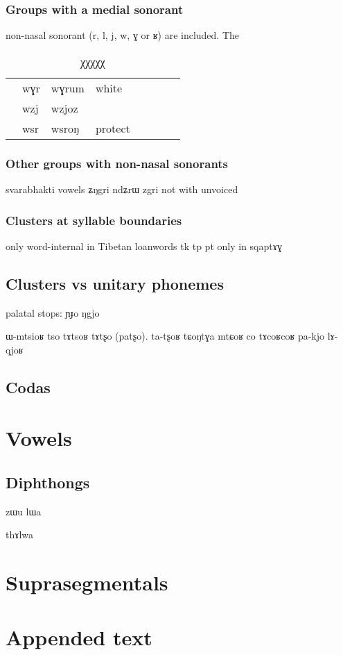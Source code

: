 \documentclass[oldfontcommands,oneside,a4paper,11pt]{article}
\newcommand{\ipa}[1]{{\phon #1}} %
\begin{document}
 \subsubsection{Groups with a medial sonorant } \label{sec:medial}
  non-nasal sonorant (\ipa{r}, \ipa{l}, \ipa{j}, \ipa{w}, \ipa{ɣ} or \ipa{ʁ}) are included. The
  
 \begin{table}
 \caption{χχχχχ}
\begin{tabular}{llllllll}
&	\ipa{wɣr}  &	\ipa{wɣrum}  &white	\\
&	\ipa{wzj}  &	\ipa{wzjoz}  &	\\
  &	\ipa{wsr}  &	\ipa{wsroŋ}  &protect	\\
\end{tabular}


  \end{table} 
  
   \subsubsection{Other groups with non-nasal sonorants } \label{sec:other.non.medial}
  
 svarabhakti vowels \ipa{ʑŋgri} \ipa{ndʑrɯ} \ipa{zgri} not with unvoiced
 
 
 
 \subsubsection{Clusters at syllable boundaries}
 only word-internal in Tibetan loanwords tk tp 
 pt only in \ipa{sqaptɤɣ}
 
 
      \subsection{Clusters vs unitary phonemes} \label{sec:non.clusters}
      
      
palatal stops:      
      \ipa{ɲɟo} \ipa{ŋgjo}
      
      ɯ-mtsioʁ
	tso tɤtsoʁ 
	tɤtʂo (patʂo). ta-tʂoʁ
 tɕoŋtɣa mtɕoʁ
 co tɤcoʁcoʁ
 pa-kjo
     lɤ-qjoʁ
      \subsection{Codas} \label{sec:coda}
    
    
     \section{Vowels} \label{sec:vowels}
     
          \subsection{Diphthongs}
     zɯu
     lɯa
     
     thɤlwa
     
     \section{Suprasegmentals}
     
         
     \section{Appended text}


\end{document}
